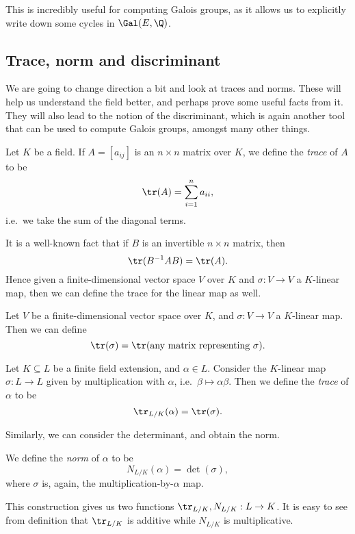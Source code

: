 \documentclass[a4paper]{article}
\begin{document}
This is incredibly useful for computing Galois groups, as it allows us to explicitly write down some cycles in $\Gal(E, \Q)$.

\subsection{Trace, norm and discriminant}
We are going to change direction a bit and look at traces and norms. These will help us understand the field better, and perhaps prove some useful facts from it. They will also lead to the notion of the discriminant, which is again another tool that can be used to compute Galois groups, amongst many other things.

\begin{defi}[Trace]
  Let $K$ be a field. If $A = [a_{ij}]$ is an $n \times n$ matrix over $K$, we define the \emph{trace} of $A$ to be
  \[
    \tr (A) = \sum_{i = 1}^n a_{ii},
  \]
  i.e.\ we take the sum of the diagonal terms.
\end{defi}

It is a well-known fact that if $B$ is an invertible $n \times n$ matrix, then
\[
  \tr (B^{-1} AB) = \tr (A).
\]
Hence given a finite-dimensional vector space $V$ over $K$ and $\sigma: V \to V$ a $K$-linear map, then we can define the trace for the linear map as well.
\begin{defi}
  Let $V$ be a finite-dimensional vector space over $K$, and $\sigma: V \to V$ a $K$-linear map. Then we can define
  \[
    \tr (\sigma) = \tr(\text{any matrix representing }\sigma).
  \]
\end{defi}

\begin{defi}
  Let $K \subseteq L$ be a finite field extension, and $\alpha \in L$. Consider the $K$-linear map $\sigma: L \to L$ given by multiplication with $\alpha$, i.e.\ $\beta \mapsto \alpha\beta$. Then we define the \emph{trace} of $\alpha$ to be
  \[
    \tr_{L/K}(\alpha) = \tr(\sigma).
  \]
\end{defi}
Similarly, we can consider the determinant, and obtain the norm.

\begin{defi}
  We define the \emph{norm} of $\alpha$ to be
  \[
    N_{L/K}(\alpha) = \det(\sigma),
  \]
  where $\sigma$ is, again, the multiplication-by-$\alpha$ map.
\end{defi}
This construction gives us two functions $\tr_{L/K}, N_{L/K}: L \to K$. It is easy to see from definition that $\tr_{L/K}$ is additive while $N_{L/K}$ is multiplicative.
\end{document}
